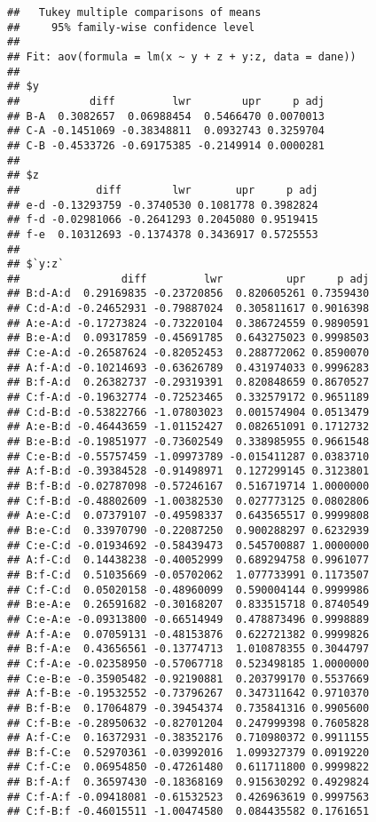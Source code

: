 \documentclass[
]{book}
\begin{document}
\begin{verbatim}
##   Tukey multiple comparisons of means
##     95% family-wise confidence level
## 
## Fit: aov(formula = lm(x ~ y + z + y:z, data = dane))
## 
## $y
##           diff         lwr        upr     p adj
## B-A  0.3082657  0.06988454  0.5466470 0.0070013
## C-A -0.1451069 -0.38348811  0.0932743 0.3259704
## C-B -0.4533726 -0.69175385 -0.2149914 0.0000281
## 
## $z
##            diff        lwr       upr     p adj
## e-d -0.13293759 -0.3740530 0.1081778 0.3982824
## f-d -0.02981066 -0.2641293 0.2045080 0.9519415
## f-e  0.10312693 -0.1374378 0.3436917 0.5725553
## 
## $`y:z`
##                diff         lwr          upr     p adj
## B:d-A:d  0.29169835 -0.23720856  0.820605261 0.7359430
## C:d-A:d -0.24652931 -0.79887024  0.305811617 0.9016398
## A:e-A:d -0.17273824 -0.73220104  0.386724559 0.9890591
## B:e-A:d  0.09317859 -0.45691785  0.643275023 0.9998503
## C:e-A:d -0.26587624 -0.82052453  0.288772062 0.8590070
## A:f-A:d -0.10214693 -0.63626789  0.431974033 0.9996283
## B:f-A:d  0.26382737 -0.29319391  0.820848659 0.8670527
## C:f-A:d -0.19632774 -0.72523465  0.332579172 0.9651189
## C:d-B:d -0.53822766 -1.07803023  0.001574904 0.0513479
## A:e-B:d -0.46443659 -1.01152427  0.082651091 0.1712732
## B:e-B:d -0.19851977 -0.73602549  0.338985955 0.9661548
## C:e-B:d -0.55757459 -1.09973789 -0.015411287 0.0383710
## A:f-B:d -0.39384528 -0.91498971  0.127299145 0.3123801
## B:f-B:d -0.02787098 -0.57246167  0.516719714 1.0000000
## C:f-B:d -0.48802609 -1.00382530  0.027773125 0.0802806
## A:e-C:d  0.07379107 -0.49598337  0.643565517 0.9999808
## B:e-C:d  0.33970790 -0.22087250  0.900288297 0.6232939
## C:e-C:d -0.01934692 -0.58439473  0.545700887 1.0000000
## A:f-C:d  0.14438238 -0.40052999  0.689294758 0.9961077
## B:f-C:d  0.51035669 -0.05702062  1.077733991 0.1173507
## C:f-C:d  0.05020158 -0.48960099  0.590004144 0.9999986
## B:e-A:e  0.26591682 -0.30168207  0.833515718 0.8740549
## C:e-A:e -0.09313800 -0.66514949  0.478873496 0.9998889
## A:f-A:e  0.07059131 -0.48153876  0.622721382 0.9999826
## B:f-A:e  0.43656561 -0.13774713  1.010878355 0.3044797
## C:f-A:e -0.02358950 -0.57067718  0.523498185 1.0000000
## C:e-B:e -0.35905482 -0.92190881  0.203799170 0.5537669
## A:f-B:e -0.19532552 -0.73796267  0.347311642 0.9710370
## B:f-B:e  0.17064879 -0.39454374  0.735841316 0.9905600
## C:f-B:e -0.28950632 -0.82701204  0.247999398 0.7605828
## A:f-C:e  0.16372931 -0.38352176  0.710980372 0.9911155
## B:f-C:e  0.52970361 -0.03992016  1.099327379 0.0919220
## C:f-C:e  0.06954850 -0.47261480  0.611711800 0.9999822
## B:f-A:f  0.36597430 -0.18368169  0.915630292 0.4929824
## C:f-A:f -0.09418081 -0.61532523  0.426963619 0.9997563
## C:f-B:f -0.46015511 -1.00474580  0.084435582 0.1761651
\end{verbatim}
\end{document}
